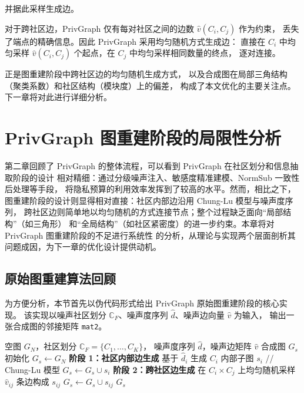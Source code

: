 \par 并据此采样生成边。

\par 对于跨社区边，PrivGraph 仅有每对社区之间的边数 $\hat{v}(C_i, C_j)$ 作为约束，
丢失了端点的精确信息。因此 PrivGraph 采用均匀随机方式生成边：
直接在 $C_i$ 中均匀采样 $\hat{v}(C_i, C_j)$ 个起点，在 $C_j$ 中均匀采样相同数量的终点，
逐对连接。

\par 正是图重建阶段中跨社区边的均匀随机生成方式，
以及合成图在局部三角结构（聚类系数）和社区结构（模块度）上的偏差，
构成了本文优化的主要关注点。下一章将对此进行详细分析。

\clearpage

\section{PrivGraph 图重建阶段的局限性分析}
\label{chap:limitation}

\par 第二章回顾了 PrivGraph 的整体流程，可以看到 PrivGraph 在社区划分和信息抽取阶段的设计
相对精细：通过分级噪声注入、敏感度精准建模、NormSub 一致性后处理等手段，
将隐私预算的利用效率发挥到了较高的水平。然而，相比之下，
图重建阶段的设计则显得相对直接：社区内部边沿用 Chung-Lu 模型与噪声度序列，
跨社区边则简单地以均匀随机的方式连接节点；整个过程缺乏面向``局部结构''（如三角形）
和``全局结构''（如社区紧密度）的进一步约束。本章将对 PrivGraph 图重建阶段的不足进行系统性
的分析，从理论与实现两个层面剖析其问题成因，为下一章的优化设计提供动机。

\subsection{原始图重建算法回顾}

\par 为方便分析，本节首先以伪代码形式给出 PrivGraph 原始图重建阶段的核心实现。
该实现以噪声社区划分 $\mathbb{C}_F$、噪声度序列 $\hat{d}$、噪声边向量 $\hat{v}$ 为输入，
输出一张合成图的邻接矩阵 \texttt{mat2}。

\begin{algorithm}[H]
    \footnotesize 
    \caption{PrivGraph 原始图重建过程}
    \label{algo:step6-original}
    \begin{algorithmic}[1]
        \REQUIRE 空图 $G_N$，社区划分 $\mathbb{C}_F = \{C_1, \ldots, C_K\}$，
                 噪声度序列 $\hat{d}$，噪声边矩阵 $\hat{v}$
        \ENSURE 合成图 $G_s$
        \STATE 初始化 $G_s \gets G_N$
        \STATE \textbf{阶段 1：社区内部边生成}
            \STATE 基于 $\hat{d}_i$ 生成 $C_i$ 内部子图 $s_i$ \quad // Chung-Lu 模型
            \STATE $G_s \gets G_s \cup s_i$
        \ENDFOR
        \STATE \textbf{阶段 2：跨社区边生成}
            \STATE 在 $C_i \times C_j$ 上均匀随机采样 $\hat{v}_{ij}$ 条边构成 $s_{ij}$
            \STATE $G_s \gets G_s \cup s_{ij}$
        \ENDFOR
        \RETURN $G_s$
    \end{algorithmic}
\end{algorithm}


